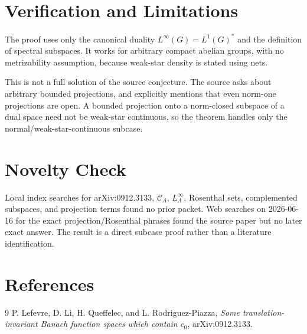 \documentclass[11pt]{article}
\newcommand{\Ccal}{\mathcal C}
\begin{document}
\section*{Verification and Limitations}

The proof uses only the canonical duality \(L^\infty(G)=L^1(G)^*\) and the
definition of spectral subspaces. It works for arbitrary compact abelian
groups, with no metrizability assumption, because weak-star density is stated
using nets.

This is not a full solution of the source conjecture. The source asks about
arbitrary bounded projections, and explicitly mentions that even norm-one
projections are open. A bounded projection onto a norm-closed subspace of a
dual space need not be weak-star continuous, so the theorem handles only the
normal/weak-star-continuous subcase.

\section*{Novelty Check}

Local index searches for arXiv:0912.3133, \(\Ccal_\Lambda\),
\(L^\infty_\Lambda\), Rosenthal sets, complemented subspaces, and projection
terms found no prior packet. Web searches on 2026-06-16 for the exact
projection/Rosenthal phrases found the source paper but no later exact answer.
The result is a direct subcase proof rather than a literature identification.

\section*{References}

\begin{thebibliography}{9}
P. Lefevre, D. Li, H. Queffelec, and L. Rodriguez-Piazza,
\emph{Some translation-invariant Banach function spaces which contain \(c_0\)},
arXiv:0912.3133.
\end{thebibliography}
\end{document}
